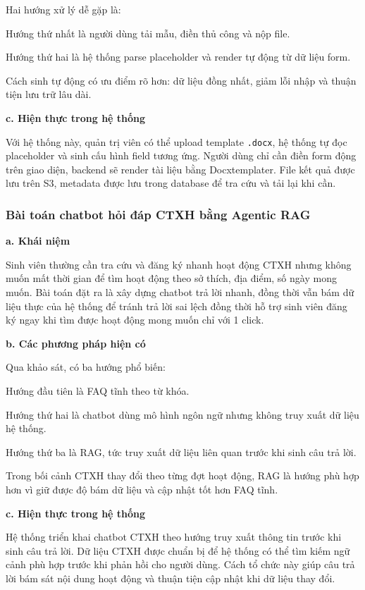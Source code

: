 Hai hướng xử lý dễ gặp là:

Hướng thứ nhất là người dùng tải mẫu, điền thủ công và nộp file.

Hướng thứ hai là hệ thống parse placeholder và render tự động từ dữ liệu form.

Cách sinh tự động có ưu điểm rõ hơn: dữ liệu đồng nhất, giảm lỗi nhập và thuận tiện lưu trữ lâu dài.

\textbf{c. Hiện thực trong hệ thống}

Với hệ thống này, quản trị viên có thể upload template \texttt{.docx}, hệ thống tự đọc placeholder và sinh cấu hình field tương ứng. Người dùng chỉ cần điền form động trên giao diện, backend sẽ render tài liệu bằng Docxtemplater. File kết quả được lưu trên S3, metadata được lưu trong database để tra cứu và tải lại khi cần.

\subsubsection{Bài toán chatbot hỏi đáp CTXH bằng Agentic RAG}
\textbf{a. Khái niệm}

Sinh viên thường cần tra cứu và đăng ký nhanh hoạt động CTXH nhưng không muốn mất thời gian để tìm hoạt động theo sở thích, địa điểm, số ngày mong muốn. Bài toán đặt ra là xây dựng chatbot trả lời nhanh, đồng thời vẫn bám dữ liệu thực của hệ thống để tránh trả lời sai lệch đồng thời hỗ trợ sinh viên đăng ký ngay khi tìm được hoạt động mong muốn chỉ với 1 click.

\textbf{b. Các phương pháp hiện có}

Qua khảo sát, có ba hướng phổ biến:

Hướng đầu tiên là FAQ tĩnh theo từ khóa.

Hướng thứ hai là chatbot dùng mô hình ngôn ngữ nhưng không truy xuất dữ liệu hệ thống.

Hướng thứ ba là RAG, tức truy xuất dữ liệu liên quan trước khi sinh câu trả lời.

Trong bối cảnh CTXH thay đổi theo từng đợt hoạt động, RAG là hướng phù hợp hơn vì giữ được độ bám dữ liệu và cập nhật tốt hơn FAQ tĩnh.

\textbf{c. Hiện thực trong hệ thống}

Hệ thống triển khai chatbot CTXH theo hướng truy xuất thông tin trước khi sinh câu trả lời. Dữ liệu CTXH được chuẩn bị để hệ thống có thể tìm kiếm ngữ cảnh phù hợp trước khi phản hồi cho người dùng. Cách tổ chức này giúp câu trả lời bám sát nội dung hoạt động và thuận tiện cập nhật khi dữ liệu thay đổi.

\clearpage